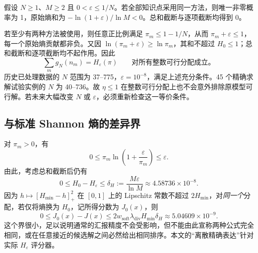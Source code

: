 \documentclass[UTF8,11pt,a4paper,fontset=fandol]{ctexart}
\begin{document}
假设 $N\ge1$、$M\ge2$ 且 $0<\varepsilon\le1/N$。若全部知识点采用同一方法，则唯一非零概率为 1，原始熵和为 $-\ln(1+\varepsilon)/\ln M<0$。总和截断与逐项截断均得到 0。

若至少有两种方法被使用，则任意正比例满足 $\pi_m\le1-1/N$，从而 $\pi_m+\varepsilon\le1$，每一个原始熵贡献都非负。又因 $\ln(\pi_m+\varepsilon)\ge\ln\pi_m$，其和不超过 $H_0\le1$；总和截断和逐项截断均不起作用。因此
\begin{equation}
 \sum_m g_N(n_m)=H_\varepsilon(\pi)\qquad
 \text{对所有整数可行分配成立。}\label{eq:clipproof}
\end{equation}
历史已处理数据的 $N$ 范围为 37--775，$\varepsilon=10^{-8}$，满足上述充分条件。45 个精确求解试验实例的 $N$ 为 40--736。故 $\eta\le1$ 在整数可行分配上也不会意外排除原模型可行解。若未来大幅改变 $N$ 或 $\varepsilon$，必须重新检查这一等价条件。

\subsection{与标准 Shannon 熵的差异界}
对 $\pi_m>0$，有
\begin{equation}
 0\le\pi_m\ln\left(1+\frac{\varepsilon}{\pi_m}\right)\le\varepsilon.
\end{equation}
由此，考虑总和截断后仍有
\begin{equation}
 0\le H_0-H_\varepsilon\le\delta_H:=\frac{M\varepsilon}{\ln M}
       \approx4.58736\times10^{-8}.\label{eq:entropybound}
\end{equation}
因为 $h\mapsto[H_{\min}-h]_+^2$ 在 $[0,1]$ 上的 Lipschitz 常数不超过 $2H_{\min}$，对\emph{同一个}分配，若仅将熵换为 $H_0$，记所得分数为 $J_0(x)$，则
\begin{equation}
 0\le J_0(x)-J(x)\le
 2w_{\mathrm{soft}}\lambda_{\mathrm{div}}H_{\min}\delta_H
 \approx5.04609\times10^{-9}.\label{eq:scorebound}
\end{equation}
这个界很小，足以说明通常的汇报精度不会受影响，但不能由此宣称两种公式完全相同，或在任意接近的候选解之间必然给出相同排序。本文的“离散精确表达”针对实际 $H_\varepsilon$ 评分器。
\end{document}
